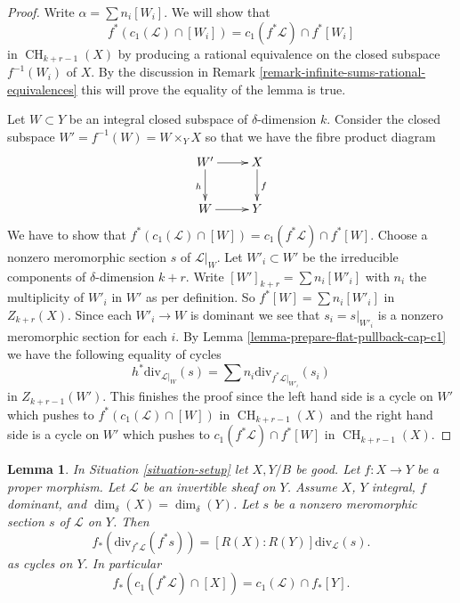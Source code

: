 \documentclass{stacks-project}
\theoremstyle{plain}
\newtheorem{lemma}[subsection]{Lemma}
\theoremstyle{definition}
\theoremstyle{remark}
\numberwithin{equation}{subsection}
\def\CH{\mathop{\mathrm{CH}}\nolimits}
\begin{document}
\begin{proof}
Write $\alpha = \sum n_i[W_i]$. We will show that
$$
f^*(c_1(\mathcal{L}) \cap [W_i]) = c_1(f^*\mathcal{L}) \cap f^*[W_i]
$$
in $\CH_{k + r - 1}(X)$ by producing a rational equivalence
on the closed subspace $f^{-1}(W_i)$ of $X$.
By the discussion in
Remark \ref{remark-infinite-sums-rational-equivalences}
this will prove the equality of the lemma is true.

\medskip\noindent
Let $W \subset Y$ be an integral closed subspace of $\delta$-dimension $k$.
Consider the closed subspace $W' = f^{-1}(W) = W \times_Y X$
so that we have the fibre product diagram
$$
\xymatrix{
W' \ar[r] \ar[d]_h & X \ar[d]^f \\
W \ar[r] & Y
}
$$
We have to show that
$f^*(c_1(\mathcal{L}) \cap [W]) = c_1(f^*\mathcal{L}) \cap f^*[W]$.
Choose a nonzero meromorphic section $s$ of $\mathcal{L}|_W$.
Let $W'_i \subset W'$ be the irreducible components of
$\delta$-dimension $k + r$. Write $[W']_{k + r} = \sum n_i[W'_i]$
with $n_i$ the multiplicity of $W'_i$ in $W'$ as per definition.
So $f^*[W] = \sum n_i[W'_i]$ in $Z_{k + r}(X)$.
Since each $W'_i \to W$ is dominant we
see that $s_i = s|_{W'_i}$ is a nonzero meromorphic section for
each $i$. By Lemma \ref{lemma-prepare-flat-pullback-cap-c1}
we have the following equality of cycles
$$
h^*\text{div}_{\mathcal{L}|_W}(s) =
\sum n_i\text{div}_{f^*\mathcal{L}|_{W'_i}}(s_i)
$$
in $Z_{k + r - 1}(W')$. This finishes the proof since
the left hand side is a cycle on $W'$ which pushes to
$f^*(c_1(\mathcal{L}) \cap [W])$ in $\CH_{k + r - 1}(X)$
and the right hand side is a cycle on $W'$ which pushes to
$c_1(f^*\mathcal{L}) \cap f^*[W]$ in $\CH_{k + r - 1}(X)$.
\end{proof}

\begin{lemma}
\label{lemma-equal-c1-as-cycles}
In Situation \ref{situation-setup} let $X, Y/B$ be good.
Let $f : X \to Y$ be a proper morphism.
Let $\mathcal{L}$ be an invertible sheaf on $Y$.
Assume $X$, $Y$ integral, $f$ dominant, and $\dim_\delta(X) = \dim_\delta(Y)$.
Let $s$ be a nonzero meromorphic section $s$ of $\mathcal{L}$ on $Y$.
Then
$$
f_*\left(\text{div}_{f^*\mathcal{L}}(f^*s)\right) =
[R(X) : R(Y)]\text{div}_\mathcal{L}(s).
$$
as cycles on $Y$. In particular
$$
f_*(c_1(f^*\mathcal{L}) \cap [X]) = c_1(\mathcal{L}) \cap f_*[Y].
$$
\end{lemma}
\end{document}
